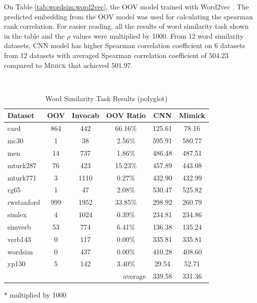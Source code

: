     On Table \ref{tab:wordsim:word2vec}, the OOV model trained with
    Word2vec \citep{Distributed2013mikolov}. The predicted embedding
    from the OOV model was used for calculating the spearman rank
    correlation. For easier reading, all the results of word
    similarity task shown in the table and the $\rho$ values were
    multiplied by 1000. From 12 word similarity datasets, CNN model
    has higher Spearman correlation coefficient on 6 datasets from 12
    datasets with averaged Spearman correlation coefficient of
    $504.23$ compared to \textsc{Mimick} that achieved $501.97$.

    \begin{table}[!ht]
      \begin{threeparttable} 
      \begin{center}
        \caption{Word Similarity Task Results (polyglot)}
        ~\\
        \label{tab:wordsim:polyglot}
        \begin{tabular}{l|c|c|c|c|c}
          \textbf{Dataset} & \textbf{OOV} & \textbf{Invocab} & \textbf{OOV Ratio} & \textbf{CNN}\tnote{*} & \textbf{Mimick}\tnote{*}\\
          \hline
          card & 864 & 442 & 66.16\% & 125.61 & 78.16\\
          mc30 & 1 & 38 & 2.56\% & 595.91 & 580.77\\
          men & 14 & 737 & 1.86\% & 486.48 & 487.51\\
          mturk287 & 76 & 423 & 15.23\% & 457.89 & 443.08\\
          mturk771 & 3 & 1110 & 0.27\% & 432.90 & 432.99\\
          rg65 & 1 & 47 & 2.08\% & 530.47 & 525.82\\
          rwstanford & 999 & 1952 & 33.85\% & 298.92 & 260.79\\
          simlex & 4 & 1024 & 0.39\% & 234.81 & 234.86\\
          simverb & 53 & 774 & 6.41\% & 136.38 & 135.24\\
          verb143 & 0 & 117 & 0.00\% & 335.81 & 335.81\\
          wordsim & 0 & 437 & 0.00\% & 410.28 & 408.60\\
          yp130 & 5 & 142 & 3.40\% & 29.54 & 52.71\\
          \hline
          \multicolumn{4}{r|}{average} & 339.58 & 331.36\\
        \end{tabular}
        \begin{tablenotes}
          \item[*] multiplied by 1000
        \end{tablenotes}
      \end{center}
    \end{threeparttable} 
    \end{table}

